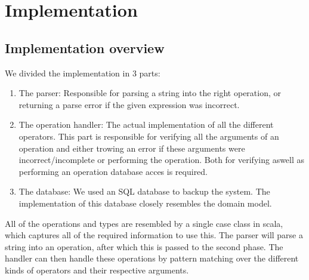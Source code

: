 \section{Implementation}

\subsection{Implementation overview}

We divided the implementation in 3 parts:
\begin{enumerate}
\item The parser: Responsible for parsing a string into the right operation, or
returning a parse error if the given expression was incorrect.
\item The operation handler: The actual implementation of all the different
operators. This part is responsible for verifying all the arguments of an
operation and either trowing an error if these arguments were
incorrect/incomplete or performing the operation. Both for verifying aswell as
performing an operation database acces is required.
\item The database: We used an SQL database to backup the system. The
implementation of this database closely resembles the domain model.
\end{enumerate} 
	
\par
All of the operations and types are resembled by a single case class in scala,
which captures all of the required information to use this. The parser will
parse a string into an operation, after which this is passed to the second
phase. The handler can then handle these operations by pattern matching over the
different kinds of operators and their respective arguments.



 
